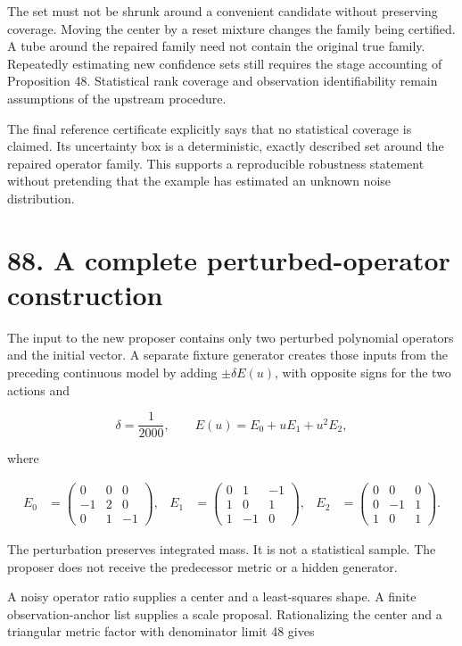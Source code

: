\documentclass[11pt,letterpaper]{article}
\begin{document}
The set must not be shrunk around a convenient candidate without
preserving coverage. Moving the center by a reset mixture changes the
family being certified. A tube around the repaired family need not
contain the original true family. Repeatedly estimating new confidence
sets still requires the stage accounting of Proposition 48. Statistical
rank coverage and observation identifiability remain assumptions of the
upstream procedure.

The final reference certificate explicitly says that no statistical
coverage is claimed. Its uncertainty box is a deterministic, exactly
described set around the repaired operator family. This supports a
reproducible robustness statement without pretending that the example
has estimated an unknown noise distribution.

\section{88. A complete perturbed-operator
construction}\label{a-complete-perturbed-operator-construction}

The input to the new proposer contains only two perturbed polynomial
operators and the initial vector. A separate fixture generator creates
those inputs from the preceding continuous model by adding
\(\pm\delta E(u)\), with opposite signs for the two actions and

\[
\delta=\frac1{2000},\qquad
E(u)=E_0+uE_1+u^2E_2,
\]

where

\[
\begin{aligned}
E_0&=\begin{pmatrix}0&0&0\\-1&2&0\\0&1&-1\end{pmatrix},&
E_1&=\begin{pmatrix}0&1&-1\\1&0&1\\1&-1&0\end{pmatrix},&
E_2&=\begin{pmatrix}0&0&0\\0&-1&1\\1&0&1\end{pmatrix}.
\end{aligned}
\]

The perturbation preserves integrated mass. It is not a statistical
sample. The proposer does not receive the predecessor metric or a hidden
generator.

A noisy operator ratio supplies a center and a least-squares shape. A
finite observation-anchor list supplies a scale proposal. Rationalizing
the center and a triangular metric factor with denominator limit 48
gives
\end{document}
